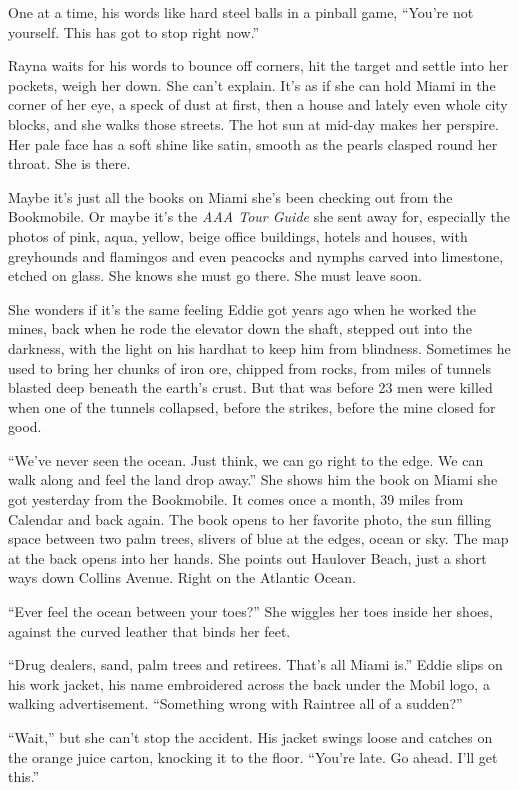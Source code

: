 \documentclass[twoside,10pt]{book}
\begin{document}
One at a time, his words like hard steel balls in a pinball game,
``You're not yourself. This has got to stop right now.''

Rayna waits for his words to bounce off corners, hit the target and
settle into her pockets, weigh her down. She can't explain. It's as if
she can hold Miami in the corner of her eye, a speck of dust at first,
then a house and lately even whole city blocks, and she walks those
streets. The hot sun at mid-day makes her perspire. Her pale face has a
soft shine like satin, smooth as the pearls clasped round her throat.
She is there.

Maybe it's just all the books on Miami she's been checking out from the
Bookmobile. Or maybe it's the \emph{AAA Tour Guide} she sent away for,
especially the photos of pink, aqua, yellow, beige office buildings,
hotels and houses, with greyhounds and flamingos and even peacocks and
nymphs carved into limestone, etched on glass. She knows she must go
there. She must leave soon.

She wonders if it's the same feeling Eddie got years ago when he worked
the mines, back when he rode the elevator down the shaft, stepped out
into the darkness, with the light on his hardhat to keep him from
blindness. Sometimes he used to bring her chunks of iron ore, chipped
from rocks, from miles of tunnels blasted deep beneath the earth's
crust. But that was before 23 men were killed when one of the tunnels
collapsed, before the strikes, before the mine closed for good.

``We've never seen the ocean. Just think, we can go right to the edge.
We can walk along and feel the land drop away.'' She shows him the book
on Miami she got yesterday from the Bookmobile. It comes once a month,
39 miles from Calendar and back again. The book opens to her favorite
photo, the sun filling space between two palm trees, slivers of blue at
the edges, ocean or sky. The map at the back opens into her hands. She
points out Haulover Beach, just a short ways down Collins Avenue. Right
on the Atlantic Ocean.

``Ever feel the ocean between your toes?'' She wiggles her toes inside
her shoes, against the curved leather that binds her feet.

``Drug dealers, sand, palm trees and retirees. That's all Miami is.''
Eddie slips on his work jacket, his name embroidered across the back
under the Mobil logo, a walking advertisement. ``Some­thing wrong with
Raintree all of a sudden?''

``Wait,'' but she can't stop the accident. His jacket swings loose and
catches on the orange juice carton, knocking it to the floor. ``You're
late. Go ahead. I'll get this.''
\end{document}
